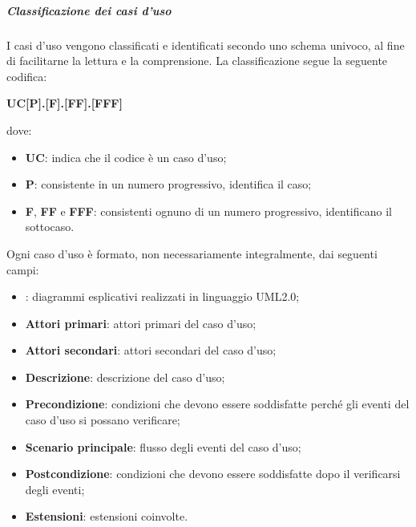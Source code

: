 \documentclass[../norme-di-progetto.tex]{subfiles}
\begin{document}
\subparagraph{Classificazione dei casi d'uso}
I casi d'uso vengono classificati e identificati secondo uno schema univoco, al fine di facilitarne la lettura e la comprensione. La classificazione segue la seguente codifica: \\
\begin{center}
  \centering
  \textbf{UC[P].[F].[FF].[FFF]}
\end{center} dove:
\begin{itemize}
  \item \textbf{UC}: indica che il codice è un caso d'uso;
  \item \textbf{P}: consistente in un numero progressivo, identifica il caso;
  \item \textbf{F}, \textbf{FF} e \textbf{FFF}: consistenti ognuno di un numero progressivo, identificano il sottocaso.
\end{itemize}
Ogni caso d'uso è formato, non necessariamente integralmente, dai seguenti campi:
\begin{itemize}
  \item \textbf{}: diagrammi esplicativi realizzati in linguaggio UML2.0;
  \item \textbf{Attori primari}: attori primari del caso d'uso;
  \item \textbf{Attori secondari}: attori secondari del caso d'uso;
  \item \textbf{Descrizione}: descrizione del caso d'uso;
  \item \textbf{Precondizione}: condizioni che devono essere soddisfatte perché gli eventi del caso d'uso si possano verificare;
  \item \textbf{Scenario principale}: flusso degli eventi del caso d'uso;
  \item \textbf{Postcondizione}: condizioni che devono essere soddisfatte dopo il verificarsi degli eventi;
  \item \textbf{Estensioni}: estensioni coinvolte.
\end{itemize}
\end{document}
